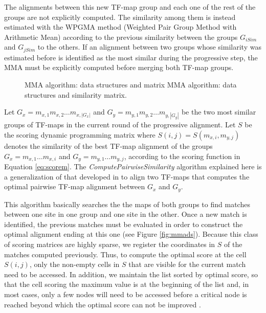 The alignments between this new TF-map group and each one of the
rest of the groups are not explicitly computed. The similarity among
them is instead estimated with the WPGMA method (Weighted Pair Group Method 
with Arithmetic Mean) according to the previous similarity between the 
groups $G_{iSim}$ and $G_{jSim}$ to the others. If an alignment between 
two groups whose similarity was estimated before is identified as the most similar 
during the progressive step, the MMA must be explicitly computed before merging 
both TF-map groups.

\begin{figure}[t!]
\begin{center}
\setlength{\fboxsep}{0pt}
          {MMA algorithm: data structures and matrix}%
          {MMA algorithm: data structures and similarity matrix.}%
          {}
\end{center}
\end{figure}



Let $G_x = m_{x,1} m_{x,2} \ldots m_{x,|G_x|}$ and 
$G_y = m_{y,1} m_{y,2} \ldots m_{y,|G_y|}$ be the two most similar groups of 
TF-maps in the current round of the progressive alignment. Let $S$ be the scoring 
dynamic programming matrix where $S(i,j) = S(m_{x,i},m_{y,j})$ denotes the similarity 
of the best TF-map alignment of the groups $G_x=m_{x,1} \ldots m_{x,i}$ and 
$G_y=m_{y,1} \ldots m_{y,j}$, according to the scoring function in Equation \ref{eq:scorem}.
The \emph{ComputePairwiseSimilarity} algorithm explained here is a generalization of 
that developed in \citep{blanco:2006b} to align two TF-maps that computes the optimal 
pairwise TF-map alignment between $G_x$ and $G_y$.

This algorithm basically searches the the maps of 
both groups to find matches between one site in one group and one site in the other. 
Once a new match is identified, the previous matches must be evaluated
in order to construct the optimal alignment ending at this one (see Figure \ref{fig:mmads}).
Because this class of scoring matrices are highly sparse, 
we register the coordinates in $S$ of the matches computed previously. 
Thus, to compute the optimal score at the cell $S(i,j)$, only the 
non-empty cells in $S$ that are visible for the current match need to be accessed. 
In addition, we maintain the list sorted by optimal score, so that the cell scoring the 
maximum value is at the beginning of the list and, in most cases, only a few nodes will
need to be accessed before a critical node is reached beyond which the
optimal score can not be improved \citep{blanco:2006b}.

